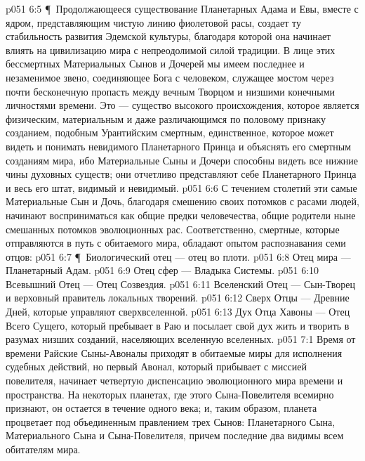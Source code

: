 \vs p051 6:5 \P\ Продолжающееся существование Планетарных Адама и Евы, вместе с ядром, представляющим чистую линию фиолетовой расы, создает ту стабильность развития Эдемской культуры, благодаря которой она начинает влиять на цивилизацию мира с непреодолимой силой традиции. В лице этих бессмертных Материальных Сынов и Дочерей мы имеем последнее и незаменимое звено, соединяющее Бога с человеком, служащее мостом через почти бесконечную пропасть между вечным Творцом и низшими конечными личностями времени. Это --- существо высокого происхождения, которое является физическим, материальным и даже различающимся по половому признаку созданием, подобным Урантийским смертным, единственное, которое может видеть и понимать невидимого Планетарного Принца и объяснять его смертным созданиям мира, ибо Материальные Сыны и Дочери способны видеть все нижние чины духовных существ; они отчетливо представляют себе Планетарного Принца и весь его штат, видимый и невидимый.
\vs p051 6:6 С течением столетий эти самые Материальные Сын и Дочь, благодаря смешению своих потомков с расами людей, начинают восприниматься как общие предки человечества, общие родители ныне смешанных потомков эволюционных рас. Соответственно, смертные, которые отправляются в путь с обитаемого мира, обладают опытом распознавания семи отцов:
\vs p051 6:7 \P\ \bibnobreakspace Биологический отец --- отец во плоти.
\vs p051 6:8 \bibnobreakspace Отец мира --- Планетарный Адам.
\vs p051 6:9 \bibnobreakspace Отец сфер --- Владыка Системы.
\vs p051 6:10 \bibnobreakspace Всевышний Отец --- Отец Созвездия.
\vs p051 6:11 \bibnobreakspace Вселенский Отец --- Сын\hyp{}Творец и верховный правитель локальных творений.
\vs p051 6:12 \bibnobreakspace Сверх Отцы --- Древние Дней, которые управляют сверхвселенной.
\vs p051 6:13 \bibnobreakspace Дух Отца Хавоны --- Отец Всего Сущего, который пребывает в Раю и посылает свой дух жить и творить в разумах низших созданий, населяющих вселенную вселенных.
\vs p051 7:1 Время от времени Райские Сыны\hyp{}Авоналы приходят в обитаемые миры для исполнения судебных действий, но первый Авонал, который прибывает с миссией повелителя, начинает четвертую диспенсацию эволюционного мира времени и пространства. На некоторых планетах, где этого Сына\hyp{}Повелителя всемирно признают, он остается в течение одного века; и, таким образом, планета процветает под объединенным правлением трех Сынов: Планетарного Сына, Материального Сына и Сына\hyp{}Повелителя, причем последние два видимы всем обитателям мира.
